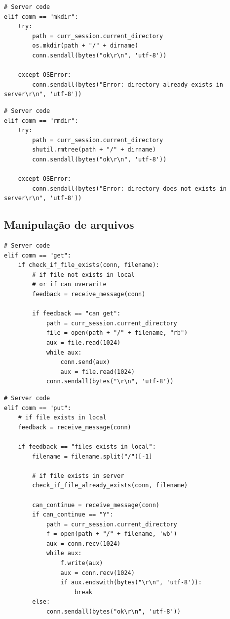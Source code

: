 \documentclass[conference]{IEEEtran}
\begin{document}
\begin{lstlisting}
# Server code
elif comm == "mkdir":
	try:
		path = curr_session.current_directory
	    os.mkdir(path + "/" + dirname)
	    conn.sendall(bytes("ok\r\n", 'utf-8'))

	except OSError:
	    conn.sendall(bytes("Error: directory already exists in server\r\n", 'utf-8'))
\end{lstlisting}

\begin{lstlisting}
# Server code
elif comm == "rmdir":
	try:
		path = curr_session.current_directory
	    shutil.rmtree(path + "/" + dirname)
	    conn.sendall(bytes("ok\r\n", 'utf-8'))
	
	except OSError:
	    conn.sendall(bytes("Error: directory does not exists in server\r\n", 'utf-8'))
\end{lstlisting}

\subsection{Manipulação de arquivos}

\begin{lstlisting}
# Server code
elif comm == "get":
	if check_if_file_exists(conn, filename):
		# if file not exists in local
		# or if can overwrite
	    feedback = receive_message(conn)

	    if feedback == "can get":
			path = curr_session.current_directory
			file = open(path + "/" + filename, "rb")
			aux = file.read(1024)
			while aux:
		    	conn.send(aux)
		    	aux = file.read(1024)
			conn.sendall(bytes("\r\n", 'utf-8'))
\end{lstlisting}

\begin{lstlisting}
# Server code
elif comm == "put":
	# if file exists in local
	feedback = receive_message(conn)

	if feedback == "files exists in local":
	    filename = filename.split("/")[-1]
	    
	    # if file exists in server
	    check_if_file_already_exists(conn, filename)

	    can_continue = receive_message(conn)
	    if can_continue == "Y":
	    	path = curr_session.current_directory
			f = open(path + "/" + filename, 'wb')
			aux = conn.recv(1024)
			while aux:
		    	f.write(aux)
		    	aux = conn.recv(1024)
		    	if aux.endswith(bytes("\r\n", 'utf-8')):
		        	break
		else:
			conn.sendall(bytes("ok\r\n", 'utf-8'))
\end{lstlisting}
\end{document}
